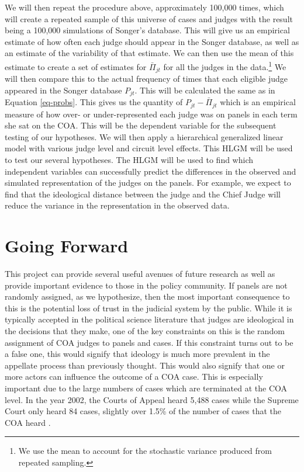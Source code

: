 \documentclass[12pt]{article}
\begin{document}
We will then repeat the procedure above, approximately 100,000 times, which will create a repeated sample of this universe of cases and judges with the result being a 100,000 simulations of Songer's database.  This will give us an empirical estimate of how often each judge should appear in the Songer database, as well as an estimate of the variability of that estimate.  We can then use the mean of this estimate to create a set of estimates for $\bar{\Pi}_{jt}$ for all the judges in the data.\footnote{We use the mean to account for the stochastic variance produced from repeated sampling.}  We will then compare this to the actual frequency of times that each eligible judge appeared in the Songer database $P_{jt}$.  This will be calculated the same as in Equation \ref{eq-probs}.  This gives us the quantity of $P_{jt}-\bar{\Pi}_{jt}$ which is an empirical measure of how over- or under-represented each judge was on panels in each term she sat on the COA.  This will be the dependent variable for the subsequent testing of our hypotheses.  We will then apply a hierarchical generalized linear model with various judge level and circuit level effects.  This HLGM will be used to test our several hypotheses.  The HLGM will be used to find which independent variables can successfully predict the differences in the observed and simulated representation of the judges on the panels.  For example, we expect to find that the ideological distance between the judge and the Chief Judge will reduce the variance in the representation in the observed data. 

\section{Going Forward}\label{Further Research}
This project can provide several useful avenues of future research as well as provide important evidence to those in the policy community.  If panels are not randomly assigned, as we hypothesize, then the most important consequence to this is the potential loss of trust in the judicial system by the public.  While it is typically accepted in the political science literature that judges are ideological in the decisions that they make, one of the key constraints on this is the random assignment of COA judges to panels and cases.  If this constraint turns out to be a false one, this would signify that ideology is much more prevalent in the appellate process than previously thought.  This would also signify that one or more actors can influence the outcome of a COA case.  This is especially important due to the large numbers of cases which are terminated at the COA level.  In the year 2002, the Courts of Appeal heard 5,488 cases while the Supreme Court only heard 84 cases, slightly over 1.5\% of the number of cases that the COA heard \citep{judyearend,Songer2007}.   
\end{document}
